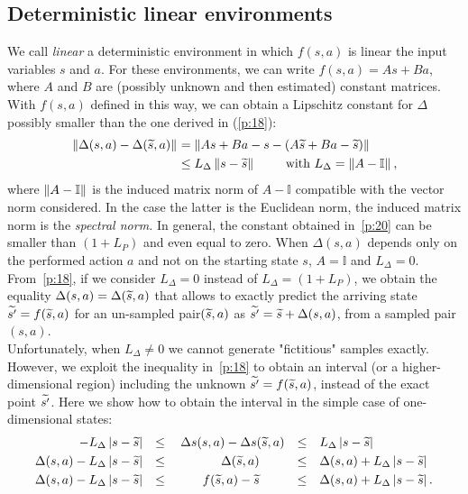 \subsection{Deterministic linear environments}\label{app:b1}
\noindent We call \textit{linear} a deterministic environment in which $f(s, a)$ is linear \wrt the input variables $s$ and $a$. For these environments, we can write $f(s,a) = As + Ba$, where $A$ and $B$ are (possibly unknown and then estimated) constant matrices. With $f(s,a)$ defined in this way, we can obtain a Lipschitz constant for $\Delta$ possibly smaller than the one derived in (\ref{p:18}):
\begin{align}
\left\|\Delta(s,a)-\Delta(\widetilde{s},a)\right\|_{} &= \left\|As+Ba-s - \left(A\widetilde{s}+Ba-\widetilde{s}\right)\right\|_{} \nonumber \\
&\leq L_{\Delta} \left\|s-\widetilde{s}\right\|_{} \qquad \text{ with } L_{\Delta}=\left\|A-\mathbb{I}\right\|_{}, \label{p:20}
\end{align}
where $\left\|A-\mathbb{I}\right\|_{}$ is the induced matrix norm of $A-\mathbb{I}$ compatible with the vector norm considered. In the case the latter is the Euclidean norm, the induced matrix norm is the \emph{spectral norm.}
In general, the constant obtained in~\eqref{p:20} can be smaller than $\left(1 + L_{P}\right)$ and even equal to zero. When $\Delta(s,a)$ depends only on the performed action $a$ and not on the starting state $s$,  $A=\mathbb{I}$ and $L_{\Delta}=0$. From~\eqref{p:18}, if we consider $L_{\Delta} = 0$ instead of $L_{\Delta} = \left(1 + L_{P}\right)$, we obtain the equality $\Delta(s,a) = \Delta(\widetilde{s}, a)$ that allows to exactly predict the arriving state $\widetilde{s'}=f(\widetilde{s}, a)$ for an un-sampled pair$(\widetilde{s}, a)$ as $\widetilde{s'} = \widetilde{s} + \Delta(s,a)$, from a sampled pair $(s,a)$.\\
\newline
Unfortunately, when $L_{\Delta} \neq 0$ we cannot generate "fictitious" samples exactly. However, we exploit the inequality in~\eqref{p:18} to obtain an interval (or a higher-dimensional region) including the unknown $\widetilde{s'}=f(\widetilde{s},a)$, instead of the exact point $\widetilde{s'}$. Here we show how to obtain the interval in the simple case of one-dimensional states:
\begin{align}
-L_{\Delta} \left|s - \wt{s}\right| &&\leq&& \Delta s (s,a) - \Delta s (\wt{s},a) &&\leq&& &L_{\Delta} \left|s - \wt{s}\right| \nonumber\\
%
\Delta(s,a) - L_{\Delta} \left|s - \wt{s}\right| &&\leq&& \qquad \Delta(\wt{s},a) \qquad &&\leq&& &\Delta(s,a) + L_{\Delta} \left|s - \wt{s}\right| \nonumber\\
%
\Delta(s,a) - L_{\Delta} \left|s - \wt{s}\right| &&\leq&& \qquad f(\wt{s},a) - \wt{s} \qquad &&\leq&& &\Delta(s,a) + L_{\Delta} \left|s - \wt{s}\right|. \label{p:19}
\end{align}
